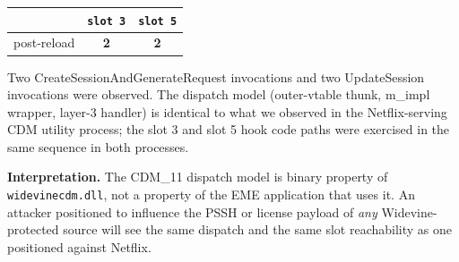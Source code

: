 \documentclass[11pt,letterpaper]{article}
\begin{document}
\begin{center}\small
\begin{tabular}{lcc}
\toprule
& \texttt{slot 3} & \texttt{slot 5} \\
\midrule
post-reload & \textbf{2} & \textbf{2} \\
\bottomrule
\end{tabular}
\end{center}

\noindent Two CreateSessionAndGenerateRequest invocations and two
UpdateSession invocations were observed.  The dispatch model
(outer-vtable thunk, m\_impl wrapper, layer-3 handler) is identical
to what we observed in the Netflix-serving CDM utility process; the
slot 3 and slot 5 hook code paths were exercised in the same
sequence in both processes.

\textbf{Interpretation.}  The CDM\_11 dispatch model is binary
property of \texttt{widevinecdm.dll}, not a property of the EME
application that uses it.  An attacker positioned to influence the
PSSH or license payload of \emph{any} Widevine-protected source will
see the same dispatch and the same slot reachability as one
positioned against Netflix.
\end{document}
